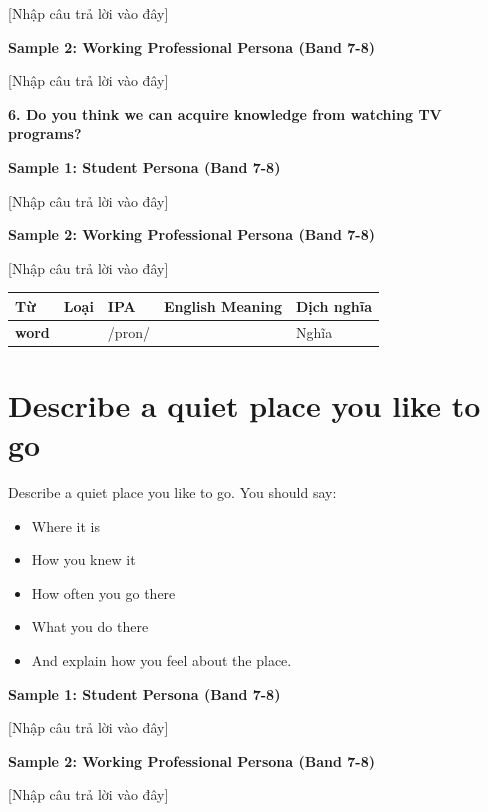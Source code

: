 [Nhập câu trả lời vào đây]

\textbf{Sample 2: Working Professional Persona (Band 7-8)}

[Nhập câu trả lời vào đây]

\separator

\begin{ieltsquestion}
\textbf{6. Do you think we can acquire knowledge from watching TV programs?}
\end{ieltsquestion}
\textbf{Sample 1: Student Persona (Band 7-8)}

[Nhập câu trả lời vào đây]

\textbf{Sample 2: Working Professional Persona (Band 7-8)}

[Nhập câu trả lời vào đây]

\separator


\vspace{0.8em}
\begin{center}
\renewcommand{\arraystretch}{1.65}
\begin{tabularx}{\textwidth}{|V{0.22\textwidth}|C{0.07\textwidth}|I{0.20\textwidth}|Y|V{0.18\textwidth}|}
\hline
{}
\textbf{Từ} & \textbf{Loại} & \textbf{IPA} & \textbf{English Meaning} & \textbf{Dịch nghĩa} \\
\hline
\textbf{word} & & /pron/ & & Nghĩa \\ \hline
\end{tabularx}
\end{center}

\newpage

\section{Describe a quiet place you like to go}
\begin{ieltsprompt}
Describe a quiet place you like to go.
You should say:
\begin{itemize}[leftmargin=2em, itemsep=2pt]
\item Where it is
\item How you knew it
\item How often you go there
\item What you do there
\item And explain how you feel about the place.
\end{itemize}
\end{ieltsprompt}
\begin{ieltsanswer}
\textbf{Sample 1: Student Persona (Band 7-8)}

[Nhập câu trả lời vào đây]

\textbf{Sample 2: Working Professional Persona (Band 7-8)}

[Nhập câu trả lời vào đây]
\end{ieltsanswer}


